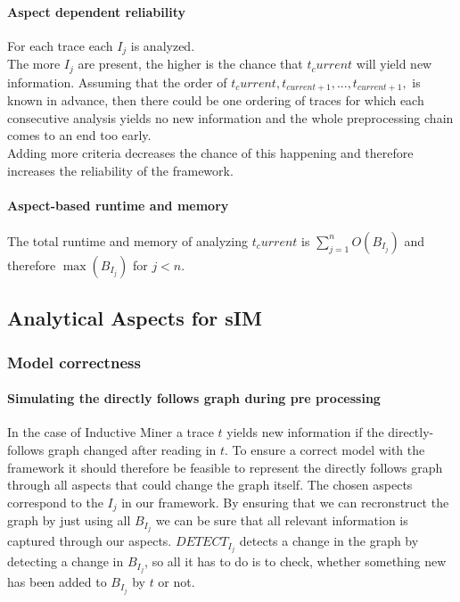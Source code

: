 \documentclass[
	a4paper,
	pagesize,
	pdftex,
	12pt,
	twoside, %
	BCOR=5mm, %
	ngerman,
	fleqn,
	final,
	]{scrartcl}
\begin{document}
\paragraph{Aspect dependent reliability}
For each trace each $I_j$ is analyzed.\\ The more $I_j$ are present, the higher is the chance that $t_current$ will yield new information. Assuming that the order of $t_current,t_{current+1},...,t_{current+1},$ is known in advance, then there could be one ordering of traces for which each consecutive analysis yields no new information and the whole preprocessing chain comes to an end too early.\\
Adding more criteria decreases the chance of this happening and therefore increases the reliability of the framework.
\paragraph{Aspect-based runtime and memory}
The total runtime and memory of analyzing $t_current$ is $\sum_{j=1}^{n} O(B_{I_j})$ and therefore $\max(B_{I_j})$ for $j<n$.
\subsection{Analytical Aspects for sIM}
\subsubsection{Model correctness}
\paragraph{Simulating the directly follows graph during pre processing}
In the case of Inductive Miner a trace $t$ yields new information if the directly-follows graph changed after reading in $t$.
To ensure a correct model with the framework it should therefore be feasible to represent the directly follows graph through all aspects that could change the graph itself. The chosen aspects correspond to the $I_j$ in our framework. By ensuring that we can recronstruct the graph by just using all $B_{I_j}$ we can be sure that all relevant information is captured through our aspects. $DETECT_{I_j}$ detects a change in the graph by detecting a change in $B_{I_j}$, so all it has to do is to check, whether something new has been added to $B_{I_j}$ by $t$ or not.
\end{document}
